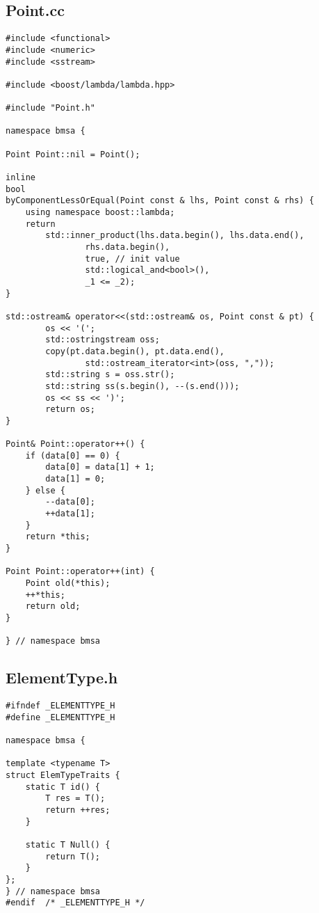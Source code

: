 \subsection*{Point.cc}
\begin{lstlisting}
#include <functional>
#include <numeric>
#include <sstream>

#include <boost/lambda/lambda.hpp>

#include "Point.h"

namespace bmsa {

Point Point::nil = Point();

inline
bool
byComponentLessOrEqual(Point const & lhs, Point const & rhs) {
    using namespace boost::lambda;
    return
        std::inner_product(lhs.data.begin(), lhs.data.end(), 
                rhs.data.begin(),
                true, // init value
                std::logical_and<bool>(),
                _1 <= _2);
}

std::ostream& operator<<(std::ostream& os, Point const & pt) {
        os << '(';
        std::ostringstream oss;
        copy(pt.data.begin(), pt.data.end(),
                std::ostream_iterator<int>(oss, ","));
        std::string s = oss.str();
        std::string ss(s.begin(), --(s.end()));
        os << ss << ')';
        return os;
}

Point& Point::operator++() {
    if (data[0] == 0) {
        data[0] = data[1] + 1;
        data[1] = 0;
    } else {
        --data[0];
        ++data[1];
    }
    return *this;
}

Point Point::operator++(int) {
    Point old(*this);
    ++*this;
    return old;
}

} // namespace bmsa
\end{lstlisting}

\subsection*{ElementType.h}
\begin{lstlisting}
#ifndef _ELEMENTTYPE_H
#define	_ELEMENTTYPE_H

namespace bmsa {

template <typename T>
struct ElemTypeTraits {
    static T id() {
        T res = T();
        return ++res;
    }

    static T Null() {
        return T();
    }
};
} // namespace bmsa
#endif	/* _ELEMENTTYPE_H */
\end{lstlisting}

